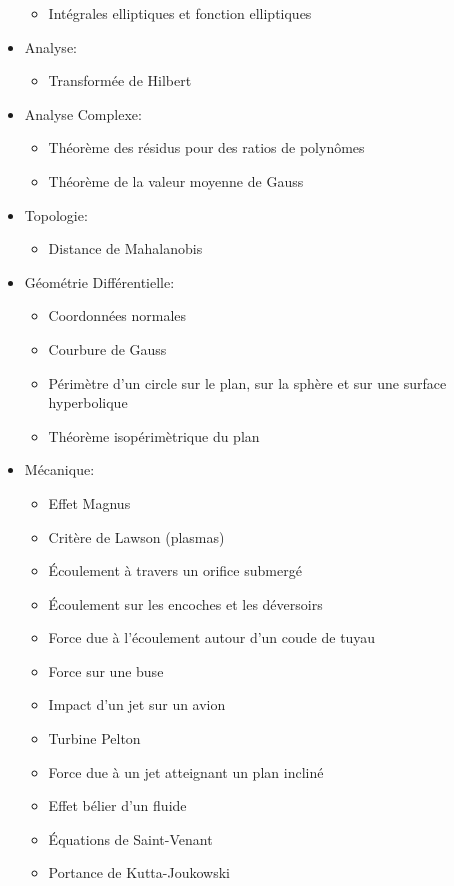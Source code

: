\begin{itemize}
\begin{itemize}
				\item Intégrales elliptiques et fonction elliptiques
			\end{itemize}
		\item Analyse: 
			\begin{itemize}
				\item Transformée de Hilbert
			\end{itemize}
		\item Analyse Complexe: 
			\begin{itemize}
				\item Théorème des résidus pour des ratios de polynômes
				\item Théorème de la valeur moyenne de Gauss
			\end{itemize}
		\item Topologie: 
			\begin{itemize}
				\item Distance de Mahalanobis
			\end{itemize}			
		\item Géométrie Différentielle: 
			\begin{itemize}
				\item Coordonnées normales
				\item Courbure de Gauss
				\item Périmètre d'un circle sur le plan, sur la sphère et sur une surface hyperbolique
				\item Théorème isopérimètrique du plan
			\end{itemize}
		\item Mécanique: 
			\begin{itemize}
				\item Effet Magnus
				\item Critère de Lawson (plasmas)
				\item Écoulement à travers un orifice submergé
				\item Écoulement sur les encoches et les déversoirs
				\item Force due à l'écoulement autour d'un coude de tuyau
				\item Force sur une buse
				\item Impact d'un jet sur un avion
				\item Turbine Pelton
				\item Force due à un jet atteignant un plan incliné
				\item Effet bélier d'un fluide
				\item Équations de Saint-Venant
				\item Portance de Kutta-Joukowski

\end{itemize}
\end{itemize}
